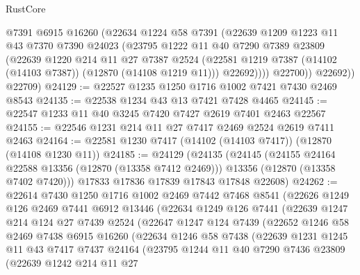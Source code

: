 \begin{lexlean}{RustCore}
\begin{coremodule}
              @7391
              @6915
              @16260
              (@22634
                @1224
                @58
                @7391
                (@22639
                  @1209
                  @1223
                  @11
                  @43
                  @7370
                  @7390
                  @24023
                  (@23795
                    @1222
                    @11
                    @40
                    @7290
                    @7389
                    @23809
                    (@22639
                      @1220
                      @214
                      @11
                      @27
                      @7387
                      @2524
                      (@22581 @1219 @7387 (@14102 (@14103 @7387)) (@12870 (@14108 @1219 @11)))
                      @22692))))
              @22700))
          @22692))
      @22709)
@24129 := @22527 @1235 @1250 @1716 @1002 @7421 @7430 @2469 @8543
@24135 := @22538 @1234 @43 @13 @7421 @7428 @4465
@24145 := @22547 @1233 @11 @40 @3245 @7420 @7427 @2619 @7401 @2463 @22567
@24155 := @22546 @1231 @214 @11 @27 @7417 @2469 @2524 @2619 @7411 @2463
@24164 := @22581 @1230 @7417 (@14102 (@14103 @7417)) (@12870 (@14108 @1230 @11))
@24185 := @24129
    (@24135
      (@24145
        (@24155 @24164 @22588 @13356 (@12870 (@13358 @7412 @2469)))
        @13356
        (@12870 (@13358 @7402 @7420)))
      @17833
      @17836
      @17839
      @17843
      @17848
      @22608)
@24262 := @22614
    @7430
    @1250
    @1716
    @1002
    @2469
    @7442
    @7468
    @8541
    (@22626
      @1249
      @126
      @2469
      @7441
      @6912
      @13446
      (@22634
        @1249
        @126
        @7441
        (@22639
          @1247
          @214
          @124
          @27
          @7439
          @2524
          (@22647
            @1247
            @124
            @7439
            (@22652
              @1246
              @58
              @2469
              @7438
              @6915
              @16260
              (@22634
                @1246
                @58
                @7438
                (@22639
                  @1231
                  @1245
                  @11
                  @43
                  @7417
                  @7437
                  @24164
                  (@23795
                    @1244
                    @11
                    @40
                    @7290
                    @7436
                    @23809
                    (@22639
                      @1242
                      @214
                      @11
                      @27

\end{coremodule}
\end{lexlean}
